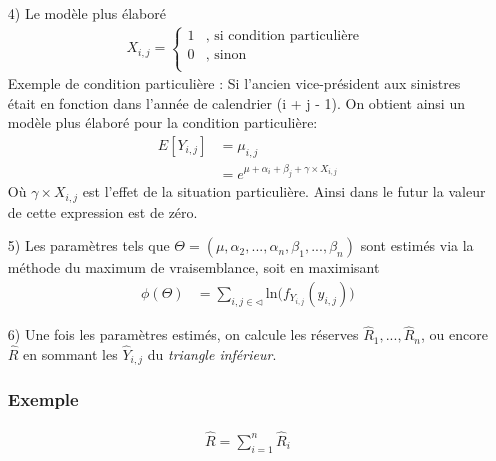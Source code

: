 \begin{itemize}
\item[4)] Le modèle plus élaboré
\begin{align*}
	X_{i,j} =
     \left\{
     \begin{array}{rl}
      1 &, \text{ si condition particulière }  \\
      0 &, \text{ sinon} \\
     \end{array}
     \right.
\end{align*}
Exemple de condition particulière :
Si l'ancien vice-président aux sinistres était en fonction dans l'année de calendrier (i + j - 1).
On obtient ainsi un modèle plus élaboré pour la condition particulière:
\begin{align*}
E[Y_{i,j}] &= \mu_{i,j} \\
&= e^{\mu + \alpha_i+\beta_j + \gamma \times X_{i,j}}
\end{align*}
Où $\gamma \times X_{i,j}$ est l'effet de la situation particulière. Ainsi dans le futur la valeur de cette expression est de zéro.

\item[5)] Les paramètres tels que $\Theta = ( \mu, \alpha_2, ..., \alpha_n, \beta_1,..., \beta_n)$ sont estimés via la méthode du maximum de vraisemblance, soit en maximisant
\begin{align*}
\phi (\Theta) &= \sum_{i, j \in \triangleleft}^{} \text{ln} \big( f_{Y_{i, j}}(y_{i,j})\big)
\end{align*}

\item[6)] Une fois les paramètres estimés, on calcule les réserves $\widehat{R}_1, ..., \widehat{R}_n$, ou encore $\widehat{R}$ en sommant les $\widehat{Y}_{i,j}$ du \textit{triangle inférieur}.
\subsubsection*{Exemple}

\begin{align*}
\widehat{R}= \sum_{i=1}^{n} \widehat{R}_i
\end{align*}


\end{itemize}
